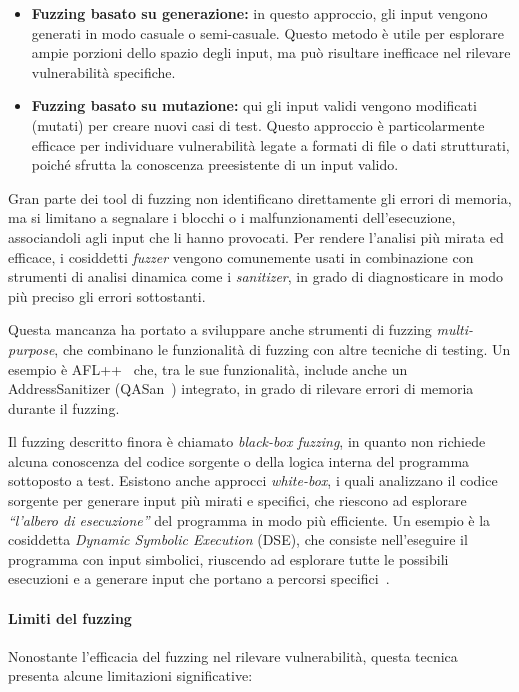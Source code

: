 \begin{itemize}
  \item \textbf{Fuzzing basato su generazione:} in questo approccio, gli input vengono
    generati in modo casuale o semi-casuale. Questo metodo è utile per esplorare ampie porzioni dello
    spazio degli input, ma può risultare inefficace nel rilevare vulnerabilità
    specifiche.

  \item \textbf{Fuzzing basato su mutazione:} qui gli input validi vengono
    modificati (mutati) per creare nuovi casi di test. Questo approccio è particolarmente
    efficace per individuare vulnerabilità legate a formati di file o dati strutturati,
    poiché sfrutta la conoscenza preesistente di un input valido.
\end{itemize}

Gran parte dei tool di fuzzing non identificano direttamente gli errori di
memoria, ma si limitano a segnalare i blocchi o i malfunzionamenti dell'esecuzione,
associandoli agli input che li hanno provocati. Per rendere l'analisi più mirata
ed efficace, i cosiddetti \textit{fuzzer} vengono comunemente usati in combinazione
con strumenti di analisi dinamica come i \textit{sanitizer}, in grado di diagnosticare
in modo più preciso gli errori sottostanti.

Questa mancanza ha portato a sviluppare anche strumenti di fuzzing \textit{multi-purpose},
che combinano le funzionalità di fuzzing con altre tecniche di testing. Un
esempio è AFL++~\cite{afl_plus_plus} che, tra le sue funzionalità, include anche un
AddressSanitizer (QASan~\cite{qasan}) integrato, in grado di rilevare errori di memoria
durante il fuzzing.

Il fuzzing descritto finora è chiamato \textit{black-box fuzzing}, in quanto non
richiede alcuna conoscenza del codice sorgente o della logica interna del programma
sottoposto a test. Esistono anche approcci \textit{white-box}, i quali
analizzano il codice sorgente per generare input più mirati e specifici, che riescono
ad esplorare \textit{``l'albero di esecuzione''} del programma in modo più
efficiente. Un esempio è la cosiddetta \textit{Dynamic Symbolic Execution} (DSE),
che consiste nell'eseguire il programma con input simbolici, riuscendo ad
esplorare tutte le possibili esecuzioni e a generare input che portano a
percorsi specifici~\cite{dynamic_symbolic_execution}.

\paragraph{Limiti del fuzzing}
Nonostante l'efficacia del fuzzing nel rilevare vulnerabilità, questa tecnica presenta
alcune limitazioni significative:

